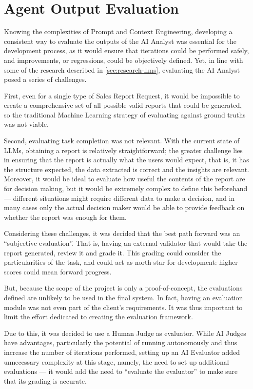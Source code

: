 \documentclass[a4paper]{report}
\begin{document}
\section{Agent Output Evaluation}
\label{sec:agent-evals}

Knowing the complexities of Prompt and Context Engineering, developing a consistent way to evaluate the outputs of the AI Analyst was essential for the development process, as it would ensure that iterations could be performed safely, and improvements, or regressions, could be objectively defined. Yet, in line with some of the research described in \autoref{sec:research-llms}, evaluating the AI Analyst posed a series of challenges.

First, even for a single type of Sales Report Request, it would be impossible to create a comprehensive set of all possible valid reports that could be generated, so the traditional Machine Learning strategy of evaluating against ground truths was not viable.

Second, evaluating task completion was not relevant. With the current state of LLMs, obtaining a report is relatively straightforward; the greater challenge lies in ensuring that the report is actually what the users would expect, that is, it has the structure expected, the data extracted is correct and the insights are relevant. Moreover, it would be ideal to evaluate how useful the contents of the report are for decision making, but it would be extremely complex to define this beforehand --- different situations might require different data to make a decision, and in many cases only the actual decision maker would be able to provide feedback on whether the report was enough for them.

Considering these challenges, it was decided that the best path forward was an ``subjective evaluation''. That is, having an external validator that would take the report generated, review it and grade it. This grading could consider the particularities of the task, and could act as north star for development: higher scores could mean forward progress.

But, because the scope of the project is only a proof-of-concept, the evaluations defined are unlikely to be used in the final system. In fact, having an evaluation module was not even part of the client's requirements. It was thus important to limit the effort dedicated to creating the evaluation framework.

Due to this, it was decided to use a Human Judge as evaluator. While AI Judges have advantages, particularly the potential of running autonomously and thus increase the number of iterations performed, setting up an AI Evaluator added unnecessary complexity at this stage, namely, the need to set up additional evaluations --- it would add the need to ``evaluate the evaluator'' to make sure that its grading is accurate.
\end{document}
